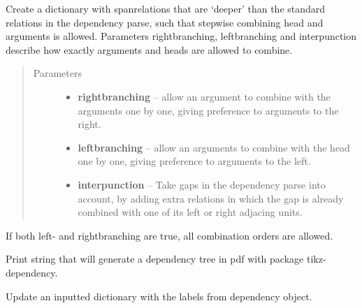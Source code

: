 \documentclass[letterpaper,10pt,english]{sphinxmanual}
\begin{document}
\begin{fulllineitems}

\begin{fulllineitems}
\label{dependencies:dependencies.Dependencies.spanrelations}
Create a dictionary with spanrelations that are `deeper' than the standard 
relations in the dependency parse, such that stepwise combining head and
arguments is allowed. Parameters rightbranching, leftbranching and interpunction
describe how exactly arguments and heads are allowed to combine.
\begin{quote}\begin{description}
\item[{Parameters}] \leavevmode\begin{itemize}
\item {} 
\textbf{rightbranching} -- allow an argument to combine with the arguments one by one,
giving preference to arguments to the right.

\item {} 
\textbf{leftbranching} -- allow an arguments to combine with the head one by one,
giving preference to arguments to the left.

\item {} 
\textbf{interpunction} -- Take gaps in the dependency parse into account, by adding
extra relations in which the gap is already combined
with one of its left or right adjacing units.

\end{itemize}

\end{description}\end{quote}

If both left- and rightbranching are true, all combination orders are allowed.

\end{fulllineitems}


\begin{fulllineitems}
\label{dependencies:dependencies.Dependencies.textree}
Print string that will generate a dependency tree in
pdf with package tikz-dependency.

\end{fulllineitems}


\begin{fulllineitems}
\label{dependencies:dependencies.Dependencies.update_labels}
Update an inputted dictionary with
the labels from dependency object.

\end{fulllineitems}


\end{fulllineitems}
\end{document}
